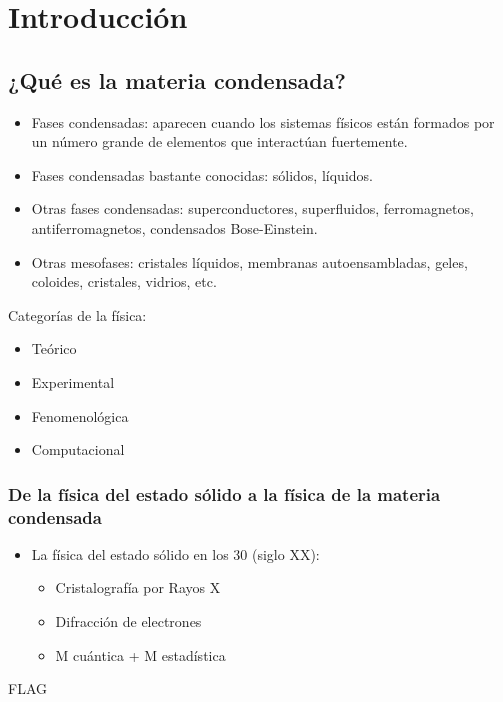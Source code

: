\chapter{Introducción}

\section{¿Qué es la materia condensada?}

\begin{itemize}
    \item Fases condensadas: aparecen cuando los sistemas f\'isicos est\'an formados por un n\'umero grande de elementos que interact\'uan fuertemente.
    \item Fases condensadas bastante conocidas: s\'olidos, l\'iquidos.
    \item Otras fases condensadas: superconductores, superfluidos, ferromagnetos, antiferromagnetos, condensados Bose-Einstein.
    \item Otras mesofases: cristales líquidos, membranas autoensambladas, geles, coloides, cristales, vidrios, etc.
\end{itemize}

Categorías de la física:
\begin{itemize}
    \item Teórico
    \item Experimental
    \item Fenomenológica
    \item Computacional
\end{itemize}

\subsection{De la física del estado sólido a la física de la materia condensada}

\begin{itemize}
    \item La física del estado sólido en los 30 (siglo XX):
    \begin{itemize}
        \item Cristalografía por Rayos X
        \item Difracción de electrones
        \item M cuántica + M estadística
    \end{itemize}
\end{itemize}

FLAG